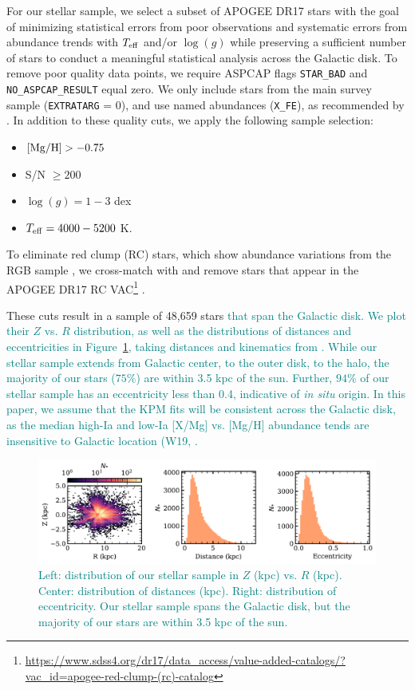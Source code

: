 \documentclass[modern]{aastex631}
\newcommand{\mgh}{[{\rm Mg}/{\rm H}]}
\newcommand{\logg}{\log(g)}
\newcommand{\teff}{T_{\rm eff}}
\newcommand{\add}[1]{\textcolor{teal}{#1}}
\begin{document}
For our stellar sample, we select a subset of APOGEE DR17 stars with the goal of minimizing statistical errors from poor observations and systematic errors from abundance trends with $\teff$ and/or $\logg$ while preserving a sufficient number of stars to conduct a meaningful statistical analysis across the Galactic disk. To remove poor quality data points, we require ASPCAP flags \texttt{STAR\_BAD} and \texttt{NO\_ASPCAP\_RESULT} equal zero. We only include stars from the main survey sample (\texttt{EXTRATARG} = 0), and use named abundances (\texttt{X\_FE}), as recommended by \citet{jonsson2020}. In addition to these quality cuts, we apply the following sample selection:
\begin{itemize}
\itemsep0em
    \item $\mgh > -0.75$
    \item S/N $\geq 200$
    \item $\logg = 1-3$ dex
    \item $\teff = 4000-5200$ K.
\end{itemize}
To eliminate red clump (RC) stars, which show abundance variations from the RGB sample \citep{vincenzo2021a}, we cross-match with and remove stars that appear in the APOGEE DR17 RC VAC\footnote{\url{https://www.sdss4.org/dr17/data_access/value-added-catalogs/?vac_id=apogee-red-clump-(rc)-catalog}} \citep{bovy2014}. 

These cuts result in a sample of 48,659 stars \add{that span the Galactic disk. We plot their $Z$ vs. $R$ distribution, as well as the distributions of distances and eccentricities in Figure~\ref{fig:star_dist}, taking distances and kinematics from \citep{queiroz2023}. While our stellar sample extends from Galactic center, to the outer disk, to the halo, the majority of our stars ($75\%$) are within 3.5 kpc of the sun. Further, $94\%$ of our stellar sample has an eccentricity less than 0.4, indicative of \textit{in situ} origin. In this paper, we assume that the KPM fits will be consistent across the Galactic disk, as the median high-Ia and low-Ia [X/Mg] vs. [Mg/H] abundance tends are insensitive to Galactic location (W19, \citealp{griffith2021a}.}   
\begin{figure}[htb!]
    \centering
    \includegraphics[width=\textwidth]{Paper/Figures/star_sample.pdf}
    \caption{\add{Left: distribution of our stellar sample in $Z$ (kpc) vs. $R$ (kpc). Center: distribution of distances (kpc). Right: distribution of eccentricity. Our stellar sample spans the Galactic disk, but the majority of our stars are within 3.5 kpc of the sun.}}
    \label{fig:star_dist}
\end{figure}
\end{document}
